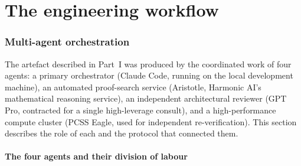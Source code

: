 \documentclass[11pt,a4paper]{article}
\theoremstyle{plain}
\theoremstyle{definition}
\begin{document}
\part{The engineering workflow}

\section{Multi-agent orchestration}
\label{sec:workflow}

The artefact described in Part~I was produced by the coordinated
work of four agents: a primary orchestrator (Claude Code, running on
the local development machine), an automated proof-search service
(Aristotle, Harmonic AI's mathematical reasoning service), an
independent architectural reviewer (GPT Pro, contracted for a single
high-leverage consult), and a high-performance compute cluster (PCSS
Eagle, used for independent re-verification). This section describes
the role of each and the protocol that connected them.

\subsection*{The four agents and their division of labour}
\end{document}
